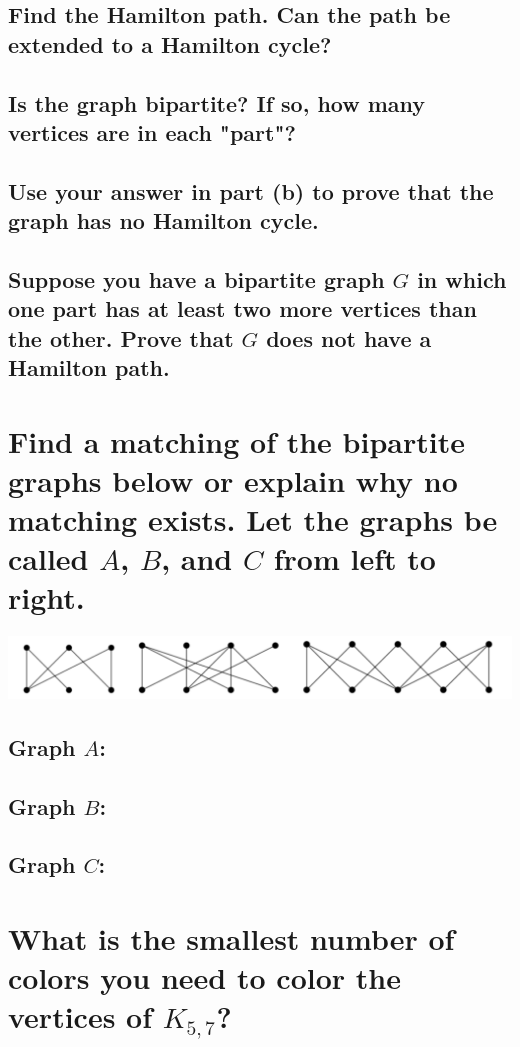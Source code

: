 \documentclass{article}
\begin{document}
\subsection{Find the Hamilton path. Can the path be extended to a Hamilton cycle?}
\subsection{Is the graph bipartite? If so, how many vertices are in each "part"?}
\subsection{Use your answer in part (b) to prove that the graph has no Hamilton cycle.}
\subsection{Suppose you have a bipartite graph $G$ in which one part has at least two more vertices than the other. Prove that $G$ does not have a Hamilton path.}
\clearpage


\section{Find a matching of the bipartite graphs below or explain why no matching exists. Let the graphs be called $A$, $B$, and $C$ from left to right.}
\begin{center}
    \includegraphics[scale=0.33]{problem3.png}
\end{center}
\subsection{Graph $A$:}
\subsection{Graph $B$:}
\subsection{Graph $C$:}
\clearpage


\section{What is the smallest number of colors you need to color the vertices of $K_{5,7}$?}
\clearpage
\end{document}
